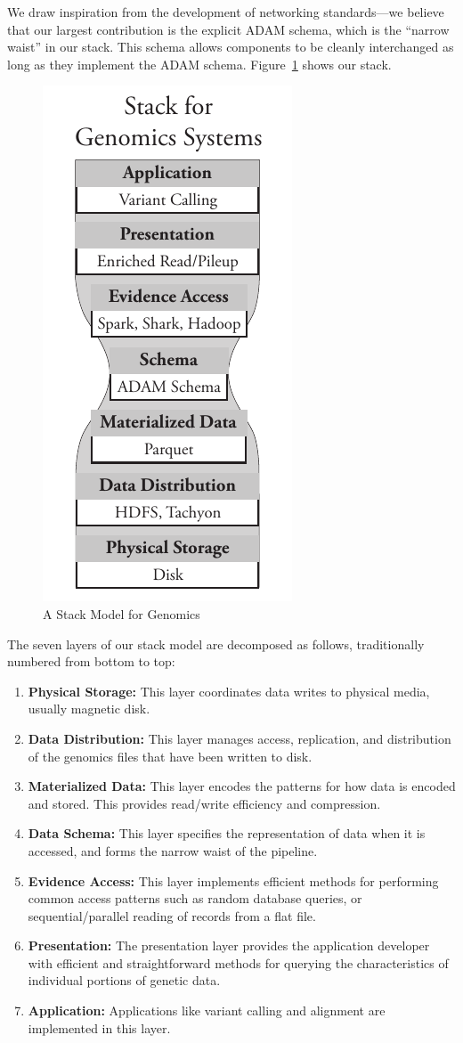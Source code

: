 \documentclass{bioinfo}
\begin{document}
We draw inspiration from the development of networking standards---we believe that our largest contribution is the explicit ADAM schema, which is the ``narrow waist''
in our stack. This schema allows components to be cleanly interchanged as long as they implement the ADAM schema. Figure~\ref{fig:stack-model} shows our stack.

\begin{figure}[h]
\begin{center}
\includegraphics[width=0.4\linewidth]{stack-model.pdf}
\end{center}
\caption{A Stack Model for Genomics}
\label{fig:stack-model}
\end{figure}

The seven layers of our stack model are decomposed as follows, traditionally numbered from bottom to top:

\begin{enumerate}
\item {\bf Physical Storage:} This layer coordinates data writes to physical media, usually magnetic disk.
\item {\bf Data Distribution:} This layer manages access, replication, and distribution of the genomics files that have been written to disk.
\item {\bf Materialized Data:} This layer encodes the patterns for how data is encoded and stored. This provides read/write efficiency
and compression.
\item {\bf Data Schema:} This layer specifies the representation of data when it is accessed, and forms the narrow waist of the pipeline.
\item {\bf Evidence Access:} This layer implements efficient methods for performing common access patterns such as random database
queries, or sequential/parallel reading of records from a flat file.
\item {\bf Presentation:} The presentation layer provides the application developer with efficient and
straightforward methods for querying the characteristics of individual portions of genetic data.
\item {\bf Application:} Applications like variant calling and alignment are implemented in this layer.
\end{enumerate}
\end{document}
